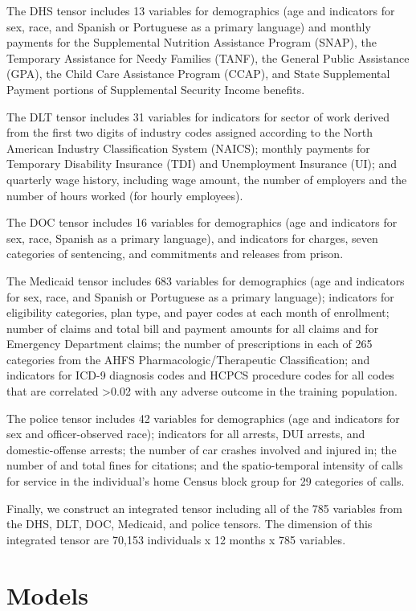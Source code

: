 \documentclass[9pt,twoside]{pnas-new}
\begin{document}
The DHS tensor includes 13 variables for demographics (age and indicators for sex, race, and Spanish or Portuguese as a primary language) and monthly payments for the Supplemental Nutrition Assistance Program (SNAP), the Temporary Assistance for Needy Families (TANF), the General Public Assistance (GPA), the Child Care Assistance Program (CCAP), and State Supplemental Payment portions of Supplemental Security Income benefits.

The DLT tensor includes 31 variables for indicators for sector of work derived from the first two digits of industry codes assigned according to the North American Industry Classification System (NAICS); monthly payments for Temporary Disability Insurance (TDI) and Unemployment Insurance (UI); and quarterly wage history, including wage amount, the number of employers and the number of hours worked (for hourly employees).

The DOC tensor includes 16 variables for demographics (age and indicators for sex, race, Spanish as a primary language), and indicators for charges, seven categories of sentencing, and commitments and releases from prison.

The Medicaid tensor includes 683 variables for demographics (age and indicators for sex, race, and Spanish or Portuguese as a primary language); indicators for eligibility categories, plan type, and payer codes at each month of enrollment; number of claims and total bill and payment amounts for all claims and for Emergency Department claims; the number of prescriptions in each of 265 categories from the AHFS Pharmacologic/Therapeutic Classification; and indicators for ICD-9 diagnosis codes and HCPCS procedure codes for all codes that are correlated >0.02 with any adverse outcome in the training population.

The police tensor includes 42 variables for demographics (age and indicators for sex and officer-observed race); indicators for all arrests, DUI arrests, and domestic-offense arrests; the number of car crashes involved and injured in; the number of and total fines for citations; and the spatio-temporal intensity of calls for service in the individual's home Census block group for 29 categories of calls.

Finally, we construct an integrated tensor including all of the 785 variables from the DHS, DLT, DOC, Medicaid, and police tensors. The dimension of this integrated tensor are 70,153 individuals x 12 months x 785 variables.

\section{Models}
\end{document}
